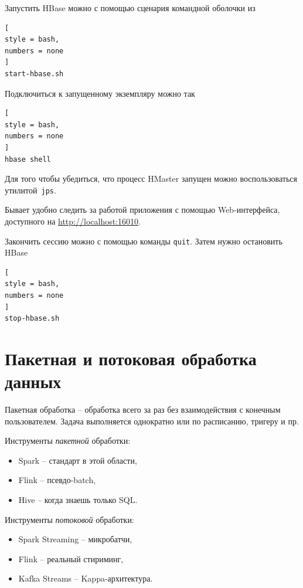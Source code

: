 \documentclass[%
	11pt,
	a4paper,
	utf8,
		]{article}
\begin{document}
Запустить HBase можно с помощью сценария командной оболочки из 
\begin{lstlisting}[
style = bash,
numbers = none	
]
start-hbase.sh
\end{lstlisting}

Подключиться к запущенному экземпляру можно так
\begin{lstlisting}[
style = bash,
numbers = none	
]
hbase shell
\end{lstlisting}

Для того чтобы убедиться, что процесс HMaster запущен можно воспользоваться утилитой~\texttt{jps}.

Бывает удобно следить за работой приложения с помощью Web-интерфейса, доступного на \url{http://localhost:16010}.

Закончить сессию можно с помощью команды \texttt{quit}. Затем нужно остановить HBase
\begin{lstlisting}[
style = bash,
numbers = none
]
stop-hbase.sh
\end{lstlisting}




\section{Пакетная и потоковая обработка данных}

Пакетная обработка -- обработка всего за раз без взаимодействия с конечным пользователем. Задача выполняется однократно или по расписанию, тригеру и пр.

Инструменты \emph{пакетной} обработки:
\begin{itemize}
	\item Spark -- стандарт в этой области,
	
	\item Flink -- псевдо-batch,
	
	\item Hive -- когда знаешь только SQL.
\end{itemize}

Инструменты \emph{потоковой} обработки:
\begin{itemize}
	\item Spark Streaming -- микробатчи,
	
	\item Flink -- реальный стириминг,
	
	\item Kafka Streams -- Kappa-архитектура.
\end{itemize}
\end{document}
